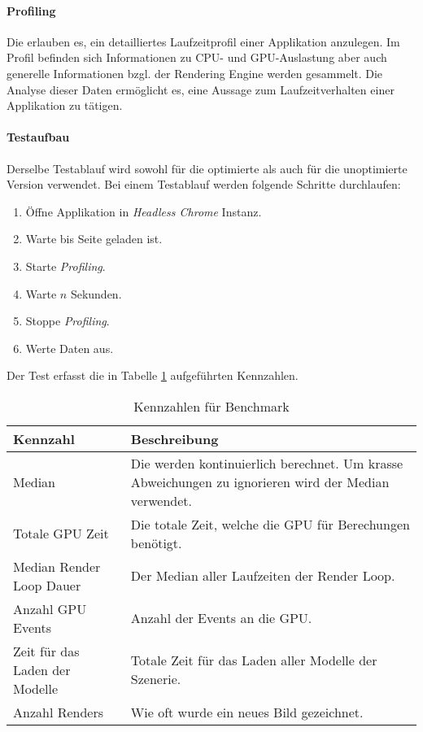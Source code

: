\paragraph{Profiling}
Die  erlauben es, ein detailliertes Laufzeitprofil einer Applikation anzulegen.
Im Profil befinden sich Informationen zu CPU- und GPU-Auslastung aber auch generelle Informationen bzgl. der \gls{Rendering Engine} werden gesammelt.
Die Analyse dieser Daten ermöglicht es, eine Aussage zum Laufzeitverhalten einer Applikation zu tätigen.

\paragraph{Testaufbau}
Derselbe Testablauf wird sowohl für die optimierte als auch für die unoptimierte Version verwendet.
Bei einem Testablauf werden folgende Schritte durchlaufen:

\begin{enumerate}
  \item Öffne Applikation in \emph{Headless Chrome} Instanz.
  \item Warte bis Seite geladen ist.
  \item Starte \emph{Profiling}.
  \item Warte $n$ Sekunden.
  \item Stoppe \emph{Profiling}.
  \item Werte Daten aus.
\end{enumerate}

Der Test erfasst die in Tabelle \ref{table:benchmarkFigures} aufgeführten Kennzahlen.

\begin{table}[H]
  \centering
  \begin{tabular}{ l p{8cm} }
  \hline
  Kennzahl & Beschreibung \\
  \hline
  \hline
  Median \e{\gls{FPS}} & Die \e{\gls{FPS}} werden kontinuierlich berechnet. Um krasse Abweichungen zu ignorieren wird der Median verwendet. \\
  \hline
  Totale GPU Zeit & Die totale Zeit, welche die GPU für Berechungen benötigt. \\
  \hline
  Median Render Loop Dauer & Der Median aller Laufzeiten der Render Loop. \\
  \hline
  Anzahl GPU Events & Anzahl der Events an die GPU. \\
  \hline
  Zeit für das Laden der Modelle & Totale Zeit für das Laden aller Modelle der Szenerie. \\
  \hline
  Anzahl Renders & Wie oft wurde ein neues Bild gezeichnet. \\
  \hline
  \end{tabular}
  \caption{Kennzahlen für Benchmark}
  \label{table:benchmarkFigures}
\end{table}

